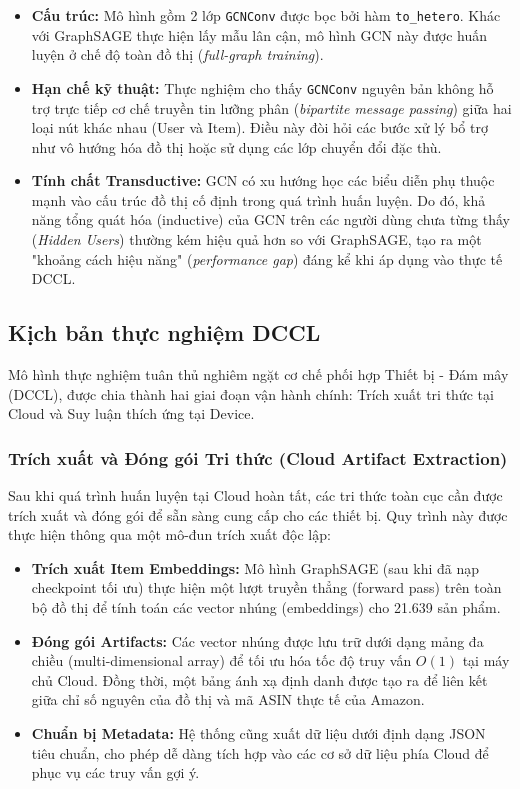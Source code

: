 \begin{itemize}
    \item \textbf{Cấu trúc:} Mô hình gồm 2 lớp \texttt{GCNConv} được bọc bởi hàm \texttt{to\_hetero}. Khác với GraphSAGE thực hiện lấy mẫu lân cận, mô hình GCN này được huấn luyện ở chế độ toàn đồ thị (\textit{full-graph training}).
    \item \textbf{Hạn chế kỹ thuật:} Thực nghiệm cho thấy \texttt{GCNConv} nguyên bản không hỗ trợ trực tiếp cơ chế truyền tin lưỡng phân (\textit{bipartite message passing}) giữa hai loại nút khác nhau (User và Item). Điều này đòi hỏi các bước xử lý bổ trợ như vô hướng hóa đồ thị hoặc sử dụng các lớp chuyển đổi đặc thù.
    \item \textbf{Tính chất Transductive:} GCN có xu hướng học các biểu diễn phụ thuộc mạnh vào cấu trúc đồ thị cố định trong quá trình huấn luyện. Do đó, khả năng tổng quát hóa (inductive) của GCN trên các người dùng chưa từng thấy (\textit{Hidden Users}) thường kém hiệu quả hơn so với GraphSAGE, tạo ra một "khoảng cách hiệu năng" (\textit{performance gap}) đáng kể khi áp dụng vào thực tế DCCL.
\end{itemize}

\subsection{Kịch bản thực nghiệm DCCL}

Mô hình thực nghiệm tuân thủ nghiêm ngặt cơ chế phối hợp Thiết bị - Đám mây (DCCL), được chia thành hai giai đoạn vận hành chính: Trích xuất tri thức tại Cloud và Suy luận thích ứng tại Device.

\subsubsection{Trích xuất và Đóng gói Tri thức (Cloud Artifact Extraction)}

Sau khi quá trình huấn luyện tại Cloud hoàn tất, các tri thức toàn cục cần được trích xuất và đóng gói để sẵn sàng cung cấp cho các thiết bị. Quy trình này được thực hiện thông qua một mô-đun trích xuất độc lập:

\begin{itemize}
    \item \textbf{Trích xuất Item Embeddings:} Mô hình GraphSAGE (sau khi đã nạp checkpoint tối ưu) thực hiện một lượt truyền thẳng (forward pass) trên toàn bộ đồ thị để tính toán các vector nhúng (embeddings) cho 21.639 sản phẩm.
    \item \textbf{Đóng gói Artifacts:} Các vector nhúng được lưu trữ dưới dạng mảng đa chiều (multi-dimensional array) để tối ưu hóa tốc độ truy vấn $O(1)$ tại máy chủ Cloud. Đồng thời, một bảng ánh xạ định danh được tạo ra để liên kết giữa chỉ số nguyên của đồ thị và mã ASIN thực tế của Amazon.
    \item \textbf{Chuẩn bị Metadata:} Hệ thống cũng xuất dữ liệu dưới định dạng JSON tiêu chuẩn, cho phép dễ dàng tích hợp vào các cơ sở dữ liệu phía Cloud để phục vụ các truy vấn gợi ý.
\end{itemize}

